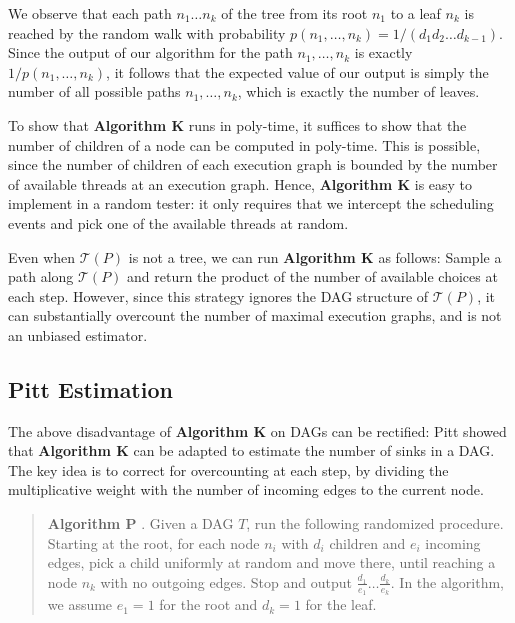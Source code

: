 We observe that each path $n_1 \ldots n_k$ of the tree from its root $n_1$ to a leaf $n_k$ is reached by the random walk with probability $p(n_1,\dots,n_k) = 1/(d_1d_2\ldots d_{k-1})$. Since the output of our algorithm for the path $n_1,\dots,n_k$
is exactly $1/p(n_1,\dots,n_k)$, it follows that the expected value of our output
is simply the number of all possible paths $n_1,\dots,n_k$,
which is exactly the number of leaves.



To show that \textbf{Algorithm K} runs in poly-time, it suffices to show that the number of children of a node can be computed in poly-time. This is possible, since  the number of children of each execution graph is bounded by the number of available threads at an execution graph.
Hence, \textbf{Algorithm K} is easy to implement in a random tester: it only requires that we intercept the scheduling events 
and pick one of the available threads at random. 

Even when $\mathcal{T}(P)$ is not a tree, we can run \textbf{Algorithm K} as follows: Sample a path along $\mathcal{T}(P)$ and return the product of the number of available choices at each step. 
However, since this strategy ignores the 
DAG structure of $\mathcal{T}(P)$, it can substantially overcount the number of maximal execution graphs, and is not an unbiased estimator.





\subsection{Pitt Estimation}

The above disadvantage of \textbf{Algorithm K} on DAGs can be rectified:
Pitt \cite{pitt} showed that \textbf{Algorithm K} can be adapted to estimate the number of sinks in a DAG. 
The key idea is to correct for overcounting at each step,  by dividing  the multiplicative weight with the  number of incoming edges to the current node.

\begin{verse}
\textbf{Algorithm P} \cite{pitt}.
Given a DAG $T$, run the following randomized procedure.
Starting at the root, for each node $n_i$ with $d_i$ children and $e_i$ incoming edges,
pick a child uniformly at random and move there, until reaching a node $n_k$ with no outgoing edges.
Stop and output $\frac{d_1}{e_1} \ldots \frac{d_k}{e_k}$.
In the algorithm, we assume $e_1 = 1$ for the root and $d_k = 1$ for the leaf.
\end{verse}


